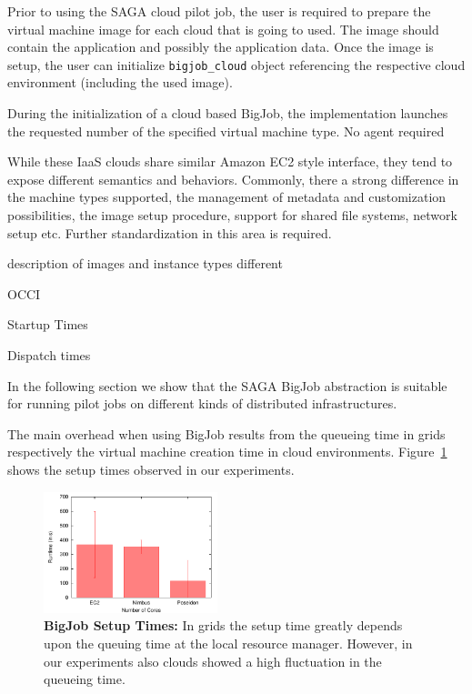 \documentclass[conference,final]{IEEEtran}
\begin{document}
Prior to using the SAGA cloud pilot job, the user is required to
prepare the virtual machine image for each cloud that is going to
used. The image should contain the application and possibly the
application data. Once the image is setup, the user can initialize
\texttt{bigjob\_cloud} object referencing the respective cloud
environment (including the used image).

During the initialization of a cloud based BigJob, the implementation
launches the requested number of the specified virtual machine type.
No agent required

While these IaaS clouds share similar Amazon EC2 style interface, they
tend to expose different semantics and behaviors. Commonly, there a
strong difference in the machine types supported, the management of
metadata and customization possibilities, the image setup procedure,
support for shared file systems, network setup etc. Further
standardization in this area is required.


description of images and instance types different

OCCI


Startup Times

Dispatch times

In the following section we show that the SAGA BigJob abstraction is
suitable for running pilot jobs on different kinds of distributed
infrastructures.

The main overhead when using BigJob results from the queueing time in grids respectively the virtual 
machine creation time in cloud environments. Figure~\ref{fig:performance_setup_time} shows the setup
times observed in our experiments. 
\begin{figure}[htbp]
    \centering
        \includegraphics[width=0.45\textwidth]{performance/setup_time.pdf}
    \caption{\textbf{BigJob Setup Times:} In grids the setup time greatly depends upon the 
    queuing time at the local resource manager. However, in our experiments also clouds showed
    a high fluctuation in the queueing time.}
    \label{fig:performance_setup_time}
\end{figure}
\end{document}
